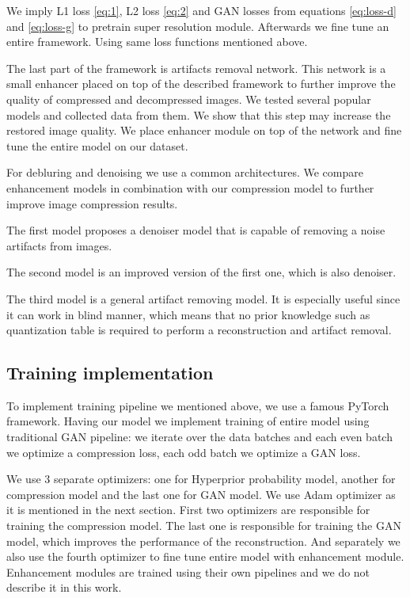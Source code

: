 We imply L1 loss \ref{eq:1}, L2 loss \ref{eq:2} and GAN losses from equations \ref{eq:loss-d} and \ref{eq:loss-g} to pretrain super resolution module. Afterwards we fine tune an entire framework. Using same loss functions mentioned above.

The last part of the framework is artifacts removal network. This network is a small enhancer placed on top of the described framework to further improve the quality of compressed and decompressed images. We tested several popular models and collected data from them. We show that this step may increase the restored image quality. We place enhancer module on top of the network and fine tune the entire model on our dataset.

For debluring and denoising we use a common architectures. We compare enhancement models \cite{zhang2017learning, zhang2020plug, jiang_towards_2021} in combination with our compression model to further improve image compression results.

The first model \cite{zhang2017learning} proposes a denoiser model that is capable of removing a noise artifacts from images.

The second model \cite{zhang2020plug} is an improved version of the first one, which is also denoiser.

The third model \cite{jiang_towards_2021} is a general artifact removing model. It is especially useful since it can work in blind manner, which means that no prior knowledge such as quantization table is required to perform a reconstruction and artifact removal.

\subsection{Training implementation}

To implement training pipeline we mentioned above, we use a famous PyTorch framework. Having our model we implement training of entire model using traditional GAN pipeline: we iterate over the data batches and each even batch we optimize a compression loss, each odd batch we optimize a GAN loss.

We use $3$ separate optimizers: one for Hyperprior probability model, another for compression model and the last one for GAN model. We use Adam optimizer as it is mentioned in the next section. First two optimizers are responsible for training the compression model. The last one is responsible for training the GAN model, which improves the performance of the reconstruction. And separately we also use the fourth optimizer to fine tune entire model with enhancement module. Enhancement modules are trained using their own pipelines and we do not describe it in this work.

